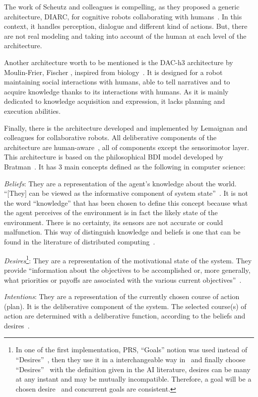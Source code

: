 \documentclass[a4paper,11pt,twoside]{StyleThese}
\begin{document}
The work of Scheutz and colleagues is compelling, as they proposed a generic architecture, DIARC, for cognitive robots collaborating with humans~\cite{scheutz_2006_utility,scheutz_2019_overview}. In this context, it handles perception, dialogue and different kind of actions. But, there are not real modeling and taking into account of the human at each level of the architecture.

Another architecture worth to be mentioned is the DAC-h3 architecture by Moulin-Frier, Fischer \etal, inspired from biology~\cite{moulin_2017_dac}. It is designed for a robot maintaining social interactions with humans, able to tell narratives and to acquire knowledge thanks to its interactions with humans. As it is mainly dedicated to knowledge acquisition and expression, it lacks planning and execution abilities.

Finally, there is the architecture developed and implemented by Lemaignan and colleagues for collaborative robots. All deliberative components of the architecture are human-aware~\cite{lemaignan_2017_artificial}, \ie all of components except the sensorimotor layer. This architecture is based on the philosophical BDI model developed by Bratman~\cite{bratman_1987_intention,bratman_1988_plans}. It has 3 main concepts defined as the following in computer science:
\begin{bulletList}
	\item \emph{Beliefs}: They are a representation of the agent’s knowledge about the world. ``[They] can be viewed as the informative component of system state''~\cite[p.~313]{rao_1995_bdi}. It is not the word ``knowledge'' that has been chosen to define this concept because what the agent perceives of the environment is in fact the likely state of the environment. There is no certainty, its sensors are not accurate or could malfunction. This way of distinguish knowledge and beliefs is one that can be found in the literature of distributed computing~\cite{lamarre_1994_knowledge}.
	\item \emph{Desires}\footnote{In one of the first implementation, PRS, ``Goals'' notion was used instead of ``Desires''~\cite{georgeff_1989_decision}, then they use it in a interchangeable way in~\cite{georgeff_1991_modeling} and finally choose ``Desires''~\cite{rao_1995_bdi} with the definition given in the AI literature, \eg desires can be many at any instant and may be mutually incompatible. Therefore, a goal will be a chosen desire~\cite{cohen_1990_intention} and concurrent goals are consistent.}: They are a representation of the motivational state of the system. They provide ``information about the objectives to be accomplished or, more generally, what priorities or payoffs are associated with the various current objectives''~\cite{rao_1995_bdi}. 
	\item \emph{Intentions}: They are a representation of the currently chosen course of action (plan). It is the deliberative component of the system. The selected course(s) of action are determined with a deliberative function, according to the beliefs and desires~\cite{rao_1995_bdi}.
\end{bulletList}
\end{document}
